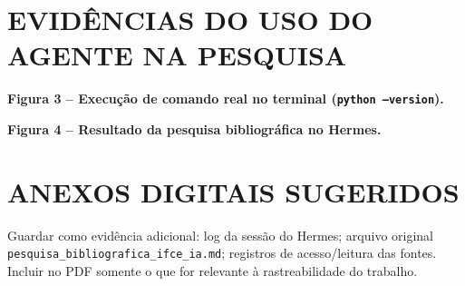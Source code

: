 \documentclass[article,12pt,oneside,a4paper,english,brazil,sumario=tradicional]{abntex2}
\begin{document}
\section{EVIDÊNCIAS DO USO DO AGENTE NA PESQUISA}
\noindent\textbf{Figura 3 -- Execução de comando real no terminal (\texttt{python --version}).}\\[-2pt]
\begin{center}\end{center}
\noindent\textbf{Figura 4 -- Resultado da pesquisa bibliográfica no Hermes.}\\[-2pt]
\begin{center}\end{center}

\section{ANEXOS DIGITAIS SUGERIDOS}
\noindent Guardar como evidência adicional: log da sessão do Hermes; arquivo original \texttt{pesquisa\_bibliografica\_ifce\_ia.md}; registros de acesso/leitura das fontes. Incluir no PDF somente o que for relevante à rastreabilidade do trabalho.
\end{document}
